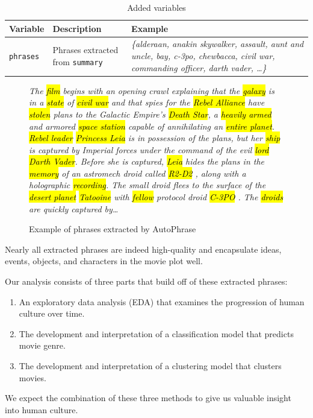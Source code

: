 \documentclass{article}
\begin{document}
\begin{multicols}{2}
\begin{table}
\caption{Added variables}
\centering
\begin{tabularx}{.8\textwidth}{llX}
    \textbf{Variable} & \textbf{Description} & \textbf{Example} \\
    \hline
    \texttt{phrases} & Phrases extracted from \texttt{summary} & \textit{\{alderaan, anakin skywalker, assault, aunt and uncle, bay, c-3po, chewbacca, civil war, commanding officer, darth vader, \ldots\}} \\
\end{tabularx}
\label{table:additional_variables}
\end{table}

\begin{figure}
\caption{Example of phrases extracted by AutoPhrase}
\begin{quoting}[leftmargin=.1\textwidth]
\small\textit{The \hl{film} begins with an opening crawl explaining that the \hl{galaxy} is in a \hl{state} of \hl{civil war} and that spies for the \hl{Rebel Alliance} have \hl{stolen} plans to the Galactic Empire's \hl{Death Star}, a \hl{heavily armed} and armored \hl{space station} capable of annihilating an \hl{entire planet}. \hl{Rebel leader} \hl{Princess Leia} is in possession of the plans, but her \hl{ship} is captured by Imperial forces under the command of the evil \hl{lord} \hl{Darth Vader}. Before she is captured, \hl{Leia} hides the plans in the \hl{memory} of an astromech droid called \hl{R2-D2} , along with a holographic \hl{recording}. The small droid flees to the surface of the \hl{desert planet} \hl{Tatooine} with \hl{fellow} protocol droid \hl{C-3PO} . The \hl{droids} are quickly captured by\ldots}
\end{quoting}
\label{figure:key_phrases_example}
\end{figure}

Nearly all extracted phrases are indeed high-quality and encapsulate ideas, events, objects, and characters in the movie plot well.

Our analysis consists of three parts that build off of these extracted phrases:
\begin{enumerate}
    \item An exploratory data analysis (EDA) that examines the progression of human culture over time.
    \item The development and interpretation of a classification model that predicts movie genre.
    \item The development and interpretation of a clustering model that clusters movies.
\end{enumerate}
We expect the combination of these three methods to give us valuable insight into human culture.

\end{multicols}
\end{document}
